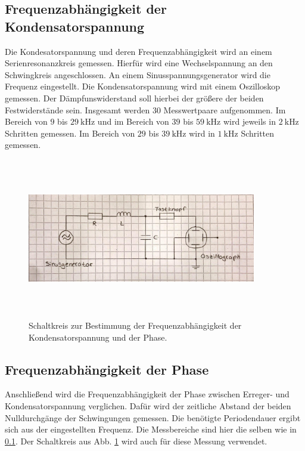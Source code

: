 \subsection{Frequenzabhängigkeit der Kondensatorspannung}
\label{sec:c}
Die Kondesatorspannung und deren Frequenzabhängigkeit wird an einem Serienresonanzkreis gemessen. Hierfür wird eine 
Wechselspannung an den Schwingkreis angeschlossen. An einem Sinusspannungsgenerator wird die Frequenz eingestellt.
Die Kondensatorspannung wird mit einem Oszilloskop gemessen. Der Dämpfunswiderstand soll hierbei der 
größere der beiden Festwiderstände sein. %
Insgesamt werden 30 Messwertpaare aufgenommen. Im Bereich von $\num{9}$ bis $\SI{29}{\kilo\hertz}$ und
im Bereich von $\num{39}$ bis $\SI{59}{\kilo\hertz}$ wird jeweils in $\SI{2}{\kilo\hertz}$ Schritten
gemessen. Im Bereich von $\num{29}$ bis $\SI{39}{\kilo\hertz}$ wird in $\SI{1}{\kilo\hertz}$ Schritten
gemessen.
\begin{figure}
    \centering
    \includegraphics[width= 10cm, height= 7cm]{build/c.jpg}
    \caption{Schaltkreis zur Bestimmung der Frequenzabhängigkeit der Kondensatorspannung und der Phase.}
    \label{fig:c}
\end{figure}

\subsection{Frequenzabhängigkeit der Phase}
Anschließend wird die Frequenzabhängigkeit der Phase zwischen Erreger- und Kondensatorspannung verglichen. Dafür 
wird der zeitliche Abstand der beiden Nulldurchgänge der Schwingungen gemessen. Die benötigte Periodendauer ergibt sich aus der eingestellten
Frequenz. Die Messbereiche sind hier die selben wie in \ref{sec:c}.
Der Schaltkreis aus Abb. \ref{fig:c} wird auch für diese Messung verwendet.
